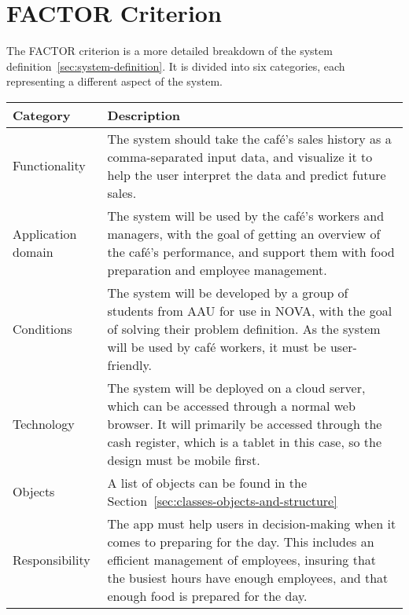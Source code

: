 \section{FACTOR Criterion}\label{sec:factor-criterion}

The FACTOR criterion is a more detailed breakdown of the system definition~\ref{sec:system-definition}.
It is divided into six categories, each representing a different aspect of the system.

\begin{tabular}{ m{2.5cm} m{10cm} }
    \toprule
    \textbf{Category} & \textbf{Description} \\
    \midrule
    Functionality & The system should take the café's sales history as a comma-separated input data, and visualize it to
    help the user interpret the data and predict future sales. \\
    \midrule
    Application domain & The system will be used by the café's workers and managers, with the goal of getting an
    overview of the café's performance, and support them with food preparation and employee management. \\
    \midrule
    Conditions & The system will be developed by a group of students from AAU for use in NOVA, with the goal of solving
    their problem definition.
    As the system will be used by café workers, it must be user-friendly. \\
    \midrule
    Technology & The system will be deployed on a cloud server, which can be accessed through a normal web browser.
    It will primarily be accessed through the cash register, which is a tablet in this case, so the design must be
    mobile first. \\
    \midrule
    Objects & A list of objects can be found in the Section~\ref{sec:classes-objects-and-structure} \\
    \midrule
    Responsibility & The app must help users in decision-making when it comes to preparing for the day.
    This includes an efficient management of employees, insuring that the busiest hours have enough employees, and
    that enough food is prepared for the day. \\
    \bottomrule
\end{tabular}
